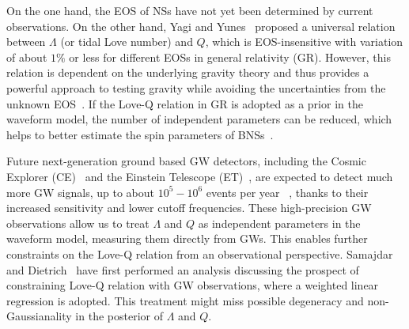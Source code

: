 \documentclass[a4paper,11pt]{article}
\begin{document}
On the one hand, the EOS of NSs have not yet been determined by current
observations. On the
other hand, Yagi 
and Yunes~\cite{Yagi:2013bca,Yagi:2013awa} proposed a universal relation between 
$\Lambda$ (or tidal Love number) and $Q$, which is EOS-insensitive 
with variation of about $1\%$ or less for different EOSs in general relativity (GR).
However, this relation is dependent on the underlying gravity theory and thus
provides a powerful approach to testing gravity while avoiding the uncertainties
from the unknown EOS~\cite{Yagi:2013bca,Silva:2020acr,Shao:2022koz}. If the Love-Q relation in GR is adopted as a prior in the waveform
model, the number of independent parameters can be reduced, which helps to
better estimate the spin parameters of BNSs~\cite{Yagi:2013bca,LIGOScientific:2018cki,
LIGOScientific:2018hze,LIGOScientific:2020aai}. 

Future next-generation ground based GW detectors, including the Cosmic Explorer 
(CE)~\cite{Reitze:2019iox,Reitze:2019dyk} and the Einstein Telescope (ET)~\cite{Punturo:2010zz,Hild:2010id,Sathyaprakash:2012jk}, 
are expected to
 detect much more GW signals, up to about $10^5-10^6$ events per year
~\cite{LIGOScientific:2017zlf,Sathyaprakash:2019yqt,Kalogera:2021bya,Samajdar:2021egv}, 
thanks to their 
increased sensitivity and lower cutoff frequencies. These high-precision GW observations allow us to treat $\Lambda$ and $Q$ as independent parameters in the waveform model, measuring them directly from GWs. This enables further constraints on the Love-Q relation from an observational perspective.
Samajdar and Dietrich~\cite{Samajdar:2020xrd} 
have first performed an analysis discussing the prospect of constraining Love-Q 
relation with GW observations, where a weighted linear regression is adopted.
This treatment might miss possible degeneracy and non-Gaussianality in the posterior of $\Lambda$ and $Q$. 
\end{document}
